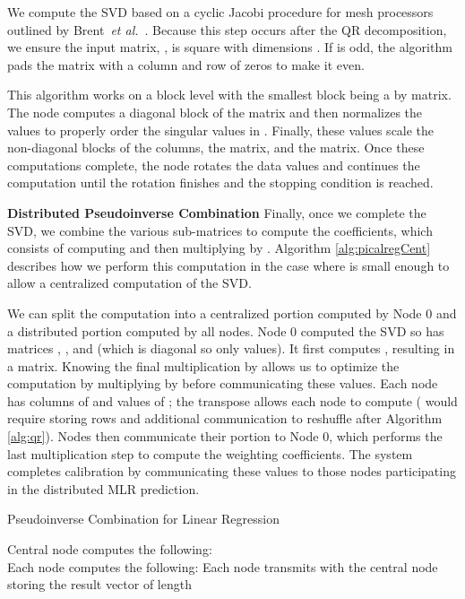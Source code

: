 \documentclass[prodmode,acmtosn]{acmsmall}
\newcommand\etal{\emph{et al.}}
\begin{document}
We compute the SVD based on a cyclic Jacobi procedure for mesh processors outlined by Brent~\etal~\cite{brentJVCS1985}.
Because this step occurs after the QR decomposition, we ensure the input matrix, , is square with dimensions .
If  is odd, the algorithm pads the matrix with a column and row of zeros to make it even.

This algorithm works on a block level with the smallest block being a  by  matrix.
The node computes a diagonal block of the matrix and then normalizes the values to properly order the singular values in .
Finally, these values scale the non-diagonal blocks of the columns, the  matrix, and the  matrix.
Once these computations complete, the node rotates the data values and continues the computation until the rotation finishes and the stopping condition is reached.

{\bf Distributed Pseudoinverse Combination}\newline
Finally, once we complete the SVD, we combine the various sub-matrices to compute the coefficients, which consists of computing  and then multiplying by .
Algorithm \ref{alg:picalregCent} describes how we perform this computation in the case where  is small enough to allow a centralized computation of the SVD.

We can split the computation into a centralized portion computed by Node 0 and a distributed portion computed by all nodes.
Node 0 computed the SVD so has matrices , , and  (which is diagonal so only  values).
It first computes , resulting in a  matrix.
Knowing the final multiplication by  allows us to optimize the computation by multiplying  by  before communicating these values.
Each node has  columns of  and  values of ; the transpose allows each node to compute  ( would require storing rows and additional communication to reshuffle  after Algorithm \ref{alg:qr}).
Nodes then communicate their portion to Node 0, which performs the last multiplication step to compute the weighting coefficients.
The system completes calibration by communicating these values to those nodes participating in the distributed MLR prediction.

\begin{algorithm}[h]
\begin{algorithmic}
\caption{Pseudoinverse Combination for Linear Regression}\label{alg:picalregCent}
\State Central node computes the following:
\State 
\State  \\

\State Each node  computes the following:
\State 
\State Each node transmits  with the central node storing the result vector of length  \\

\State 
\end{algorithmic}
\end{algorithm}
\end{document}
